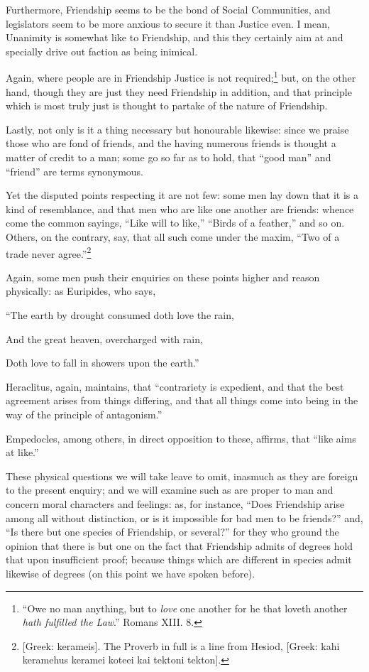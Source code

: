 Furthermore, Friendship seems to be the bond of Social Communities, and
legislators seem to be more anxious to secure it than Justice even. I mean,
Unanimity is somewhat like to Friendship, and this they certainly aim at and
specially drive out faction as being inimical.

Again, where people are in Friendship Justice is not
required;\footnote{“Owe no man anything, but to \emph{love} one another for he that loveth
another \emph{hath fulfilled the Law}.” Romans XIII. 8.}
but, on the other hand, though they are just they need Friendship in addition,
and that principle which is most truly just is thought to partake of the nature
of Friendship.

Lastly, not only is it a thing necessary but honourable likewise: since we
praise those who are fond of friends, and the having numerous friends is
thought a matter of credit to a man; some go so far as to hold, that
“good man” and “friend” are terms synonymous.


Yet the disputed points respecting it are not few: some men lay down that it is
a kind of resemblance, and that men who are like one another are friends:
whence come the common sayings, “Like will to like,” “Birds
of a feather,” and so on. Others, on the contrary, say, that all such
come under the maxim, “Two of a trade never
agree.”\footnote{[Greek: kerameis]. The Proverb in full is a line from Hesiod,
[Greek: kahi keramehus keramei koteei kai tektoni tekton].}

Again, some men push their enquiries on these points higher and reason
physically: as Euripides, who says,

“The earth by drought consumed doth love the rain,

And the great heaven, overcharged with rain,

Doth love to fall in showers upon the earth.”

Heraclitus, again, maintains, that “contrariety is expedient, and that
the best agreement arises from things differing, and that all things come into
being in the way of the principle of antagonism.”

Empedocles, among others, in direct opposition to these, affirms, that
“like aims at like.”

These physical questions we will take leave to omit, inasmuch as they are
foreign to the present enquiry; and we will examine such as are proper to man
and concern moral characters and feelings: as, for instance, “Does
Friendship arise among all without distinction, or is it impossible for bad men
to be friends?” and, “Is there but one species of Friendship, or
several?” for they who ground the opinion that there is but one on the
fact that Friendship admits of degrees hold that upon insufficient proof;
because things which are different in species admit likewise of degrees (on
this point we have spoken before).


